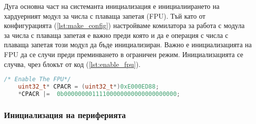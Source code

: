 Дуга основна част на системанта инициализация е инициалиирането на хардуерният модул за числа с плаваща запетая (FPU).
Тъй като от конфигурацията (\autoref{lst:make_config}) настройваме комилатора за работа с модула за числа с плаваща запетая е важно
преди която и да е операция с числа с плаваща запетая този модул да бъде инициализиран.
Важно е инициализацията на FPU да се случи преди преминването в ограничен режим.
Инициализацията се случва, чрез блокът от код (\autoref{lst:enable_fpu}).
\begin{lstlisting}[language=c, caption={Инициализация на модула за числа с плаваща запетая}, label={lst:enable_fpu}]
    /* Enable The FPU*/
    uint32_t* CPACR = (uint32_t*)0xE000ED88;
    *CPACR |=  0b00000000111100000000000000000000;
\end{lstlisting}

\subsubsection{Инициализация на периферията}





